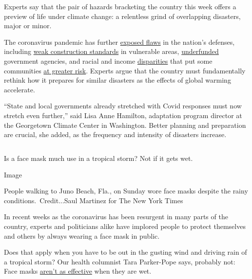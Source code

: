 Experts say that the pair of hazards bracketing the country this week
offers a preview of life under climate change: a relentless grind of
overlapping disasters, major or minor.

The coronavirus pandemic has further
\href{https://www.nytimes3xbfgragh.onion/2020/05/22/climate/fema-volunteer-disaster-response.html}{exposed
flaws} in the nation's defenses, including
\href{https://www.nytimes3xbfgragh.onion/2019/10/26/climate/building-codes-secret-deal.html}{weak
construction standards} in vulnerable areas,
\href{https://newrepublic.com/article/158486/towns-arent-equipped-handle-climate-emergencies}{underfunded}
government agencies, and racial and income
\href{https://www.nytimes3xbfgragh.onion/2020/05/17/climate/pollution-poverty-coronavirus.html}{disparities}
that put some communities
\href{https://www.nytimes3xbfgragh.onion/2020/07/24/climate/houston-flooding-race.html}{at
greater risk}. Experts argue that the country must fundamentally rethink
how it prepares for similar disasters as the effects of global warming
accelerate.

``State and local governments already stretched with Covid responses
must now stretch even further,'' said Lisa Anne Hamilton, adaptation
program director at the Georgetown Climate Center in Washington. Better
planning and preparation are crucial, she added, as the frequency and
intensity of disasters increase.

\hypertarget{-6}{%
\subsection{}\label{-6}}

Is a face mask much use in a tropical storm? Not if it gets wet.

Image

People walking to Juno Beach, Fla., on Sunday wore face masks despite
the rainy conditions.~Credit...Saul Martinez for The New York Times

In recent weeks as the coronavirus has been resurgent in many parts of
the country, experts and politicians alike have implored people to
protect themselves and others by always wearing a face mask in public.

Does that apply when you have to be out in the gusting wind and driving
rain of a tropical storm? Our health columnist Tara Parker-Pope says,
probably not: Face masks
\href{https://www.nursingtimes.net/clinical-archive/infection-control/the-effectiveness-of-surgical-face-masks-what-the-literature-shows-30-09-2003/}{aren't
as effective} when they are wet.

